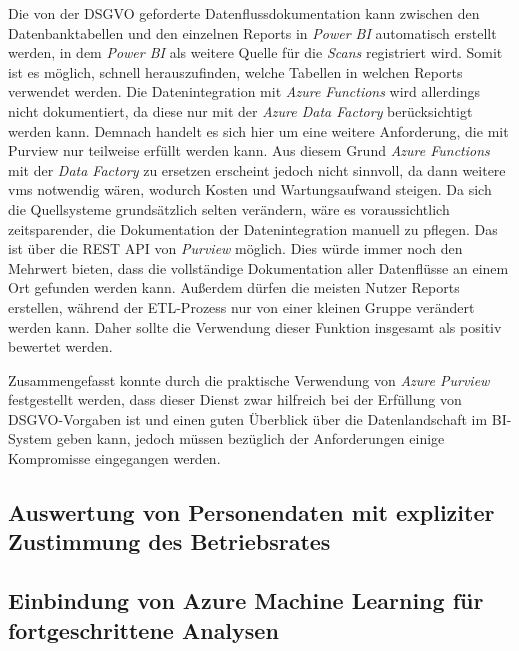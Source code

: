 Die von der DSGVO geforderte Datenflussdokumentation kann zwischen den Datenbanktabellen und den einzelnen Reports in \textit{Power BI} automatisch erstellt werden, in dem \textit{Power BI} als weitere Quelle für die \textit{Scans} registriert wird. Somit ist es möglich, schnell herauszufinden, welche Tabellen in welchen Reports verwendet werden. Die Datenintegration mit \textit{Azure Functions} wird allerdings nicht dokumentiert, da diese nur mit der \textit{Azure Data Factory} berücksichtigt werden kann. Demnach handelt es sich hier um eine weitere Anforderung, die mit Purview nur teilweise erfüllt werden kann. Aus diesem Grund \textit{Azure Functions} mit der \textit{Data Factory} zu ersetzen erscheint jedoch nicht sinnvoll, da dann weitere \acp{vm} notwendig wären, wodurch Kosten und Wartungsaufwand steigen. Da sich die Quellsysteme grundsätzlich selten verändern, wäre es voraussichtlich zeitsparender, die Dokumentation der Datenintegration manuell zu pflegen. Das ist über die REST API von \textit{Purview} möglich. Dies würde immer noch den Mehrwert bieten, dass die vollständige Dokumentation aller Datenflüsse an einem Ort gefunden werden kann. Außerdem dürfen die meisten Nutzer Reports erstellen, während der ETL-Prozess nur von einer kleinen Gruppe verändert werden kann. Daher sollte die Verwendung dieser Funktion insgesamt als positiv bewertet werden.

\cite[vgl.][]{lesteve_definitive_2021, msdoc_22_purview_sensLabel, riscutia_data_2021}

Zusammengefasst konnte durch die praktische Verwendung von \textit{Azure Purview} festgestellt werden, dass dieser Dienst zwar hilfreich bei der Erfüllung von DSGVO-Vorgaben ist und einen guten Überblick über die Datenlandschaft im BI-System geben kann, jedoch müssen bezüglich der Anforderungen einige Kompromisse eingegangen werden. 

\subsection{Auswertung von Personendaten mit expliziter Zustimmung des Betriebsrates}

\subsection{Einbindung von Azure Machine Learning für fortgeschrittene Analysen}